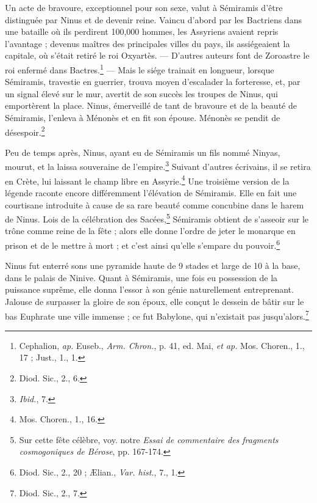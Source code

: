\documentclass[a4paper, 11pt, oneside, landscape]{article}
\begin{document}
Un acte de bravoure, exceptionnel pour son sexe, valut à Sémiramis d'être distinguée par Ninus et de devenir reine. Vaincu d'abord par les Bactriens dans une bataille où ils perdirent 100,000 hommes, les Assyriens avaient repris l'avantage ; devenus maîtres des principales villes du pays, ils assiégeaient la capitale, où s'était retiré le roi Oxyartès. --- D'autres auteurs font de Zoroastre le roi enfermé dans Bactres.\footnote{Cephalion, \emph{ap.} Euseb., \emph{Arm. Chron.}, p. 41, ed. Mai, \emph{et ap.} Mos. Choren., 1., 17 ; Just., 1., 1.} --- Mais le siége trainait en longueur, lorsque Sémiramis, travestie en guerrier, trouva moyen d'escalader la forteresse, et, par un signal élevé sur le mur, avertit de son succès les troupes de Ninus, qui emportèrent la place. Ninus, émerveillé de tant de bravoure et de la beauté de Sémiramis, l'enleva à Ménonès et en fit son épouse. Ménonès se pendit de désespoir.\footnote{Diod. Sic., 2., 6.}

Peu de temps après, Ninus, ayant eu de Sémiramis un fils nommé Ninyas, mourut, et la laissa souveraine de l'empire.\footnote{\emph{Ibid.}, 7.} Suivant d'autres écrivains, il se retira en Crète, lui laissant le champ libre en Assyrie.\footnote{Mos. Choren., 1., 16.} Une troisième version de la légende raconte encore différemment l'élévation de Sémiramis. Elle en fait une courtisane introduite à cause de sa rare beauté comme concubine dans le harem de Ninus. Lois de la célébration des Sacées,\footnote{Sur cette fête célèbre, voy. notre \emph{Essai de commentaire des fragments cosmogoniques de Bérose}, pp. 167-174.} Sémiramis obtient de s'asseoir sur le trône comme reine de la fête ; alors elle donne l'ordre de jeter le monarque en prison et de le mettre à mort ; et c'est ainsi qu'elle s'empare du pouvoir.\footnote{Diod. Sic., 2., 20 ; Ælian., \emph{Var. hist.}, 7., 1.}

Ninus fut enterré sons une pyramide haute de 9 stades et large de 10 à la base, dans le palais de Ninive. Quant à Sémiramis, une fois eu possession de la puissance suprême, elle donna l'essor à son génie naturellement entreprenant. Jalouse de surpasser la gloire de son époux, elle conçut le dessein de bâtir sur le bas Euphrate une ville immense ; ce fut Babylone, qui n'existait pas jusqu'alors.\footnote{Diod. Sic., 2., 7.}
\end{document}
